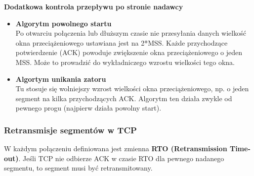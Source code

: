 \documentclass[../main.tex]{subfiles}
\begin{document}
    \textbf{Dodatkowa kontrola przepływu po stronie nadawcy}
    \begin{itemize}
        \item \textbf{Algorytm powolnego startu}\\
        Po otwarciu połączenia lub dłuższym czasie nie przesyłania danych wielkość okna
        przeciążeniowego ustawiana jest na 2*MSS. Każde przychodzące potwierdzenie (ACK)
        powoduje zwiększenie okna przeciążeniowego o jeden MSS. Może to prowadzić do wykładniczego wzrostu wielkości tego okna.
        \item \textbf{Algortym unikania zatoru}\\
        Tu stosuje się wolniejszy wzrost wielkości okna przeciążeniowego, np. o jeden
        segment na kilka przychodzących ACK. Algorytm ten działa zwykle od pewnego progu (najpierw działa powolny start).
    \end{itemize}


    \subsubsection{Retransmisje segmentów w TCP}
    W każdym połączeniu definiowana jest zmienna \textbf{RTO (Retransmission Time-out)}. Jeśli TCP nie
    odbierze ACK w czasie RTO dla pewnego nadanego segmentu, to segment musi być
    retransmitowany.
\end{document}
